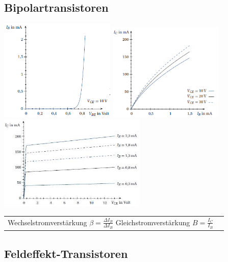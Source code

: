 \subsection{Bipolartransistoren}
\includegraphics[width=5.5cm]{images/bipolarEingangsKennlinie}
\includegraphics[width=5.5cm]{images/bipolarVerstaerkungsKennlinie}
\includegraphics[width=7cm]{images/bipolarAusgangsKennlinie}\\
\begin{tabular}{ll}
	Wechselstromverstärkung $\beta = \frac{\Delta I_B}{\Delta I_B} $
	Gleichstromverstärkung $B = \frac{I_C}{I_B}$\\
\end{tabular}

\subsection{Feldeffekt-Transistoren}


